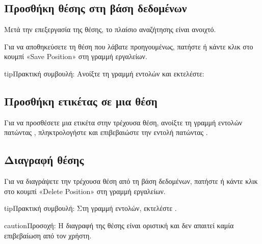 \documentclass[letterpaper,10pt,greek]{sphinxmanual}
\begin{document}
\subsection{Προσθήκη θέσης στη βάση δεδομένων}
\label{\detokenize{guide_utilisateur:ajouter-une-position-a-la-base-de-donnees}}
\sphinxAtStartPar
Μετά την επεξεργασία της θέσης, το πλαίσιο αναζήτησης είναι ανοιχτό.

\sphinxAtStartPar
Για να αποθηκεύσετε τη θέση που λάβατε προηγουμένως, πατήστε  ή κάντε κλικ στο κουμπί «Save Position» στη γραμμή εργαλείων.

\begin{sphinxadmonition}{tip}{Πρακτική συμβουλή:}
\sphinxAtStartPar
Ανοίξτε τη γραμμή εντολών και εκτελέστε: 
\end{sphinxadmonition}


\subsection{Προσθήκη ετικέτας σε μια θέση}
\label{\detokenize{guide_utilisateur:etiqueter-une-position}}
\sphinxAtStartPar
Για να προσθέσετε μια ετικέτα  στην τρέχουσα θέση, ανοίξτε τη γραμμή εντολών πατώντας , πληκτρολογήστε  και επιβεβαιώστε την εντολή πατώντας .


\subsection{Διαγραφή θέσης}
\label{\detokenize{guide_utilisateur:supprimer-une-position}}
\sphinxAtStartPar
Για να διαγράψετε την τρέχουσα θέση από τη βάση δεδομένων, πατήστε  ή κάντε κλικ στο κουμπί «Delete Position» στη γραμμή εργαλείων.

\begin{sphinxadmonition}{tip}{Πρακτική συμβουλή:}
\sphinxAtStartPar
Στη γραμμή εντολών, εκτελέστε .
\end{sphinxadmonition}

\begin{sphinxadmonition}{caution}{Προσοχή:}
\sphinxAtStartPar
Η διαγραφή της θέσης είναι οριστική και δεν απαιτεί καμία επιβεβαίωση από τον χρήστη.
\end{sphinxadmonition}
\end{document}
